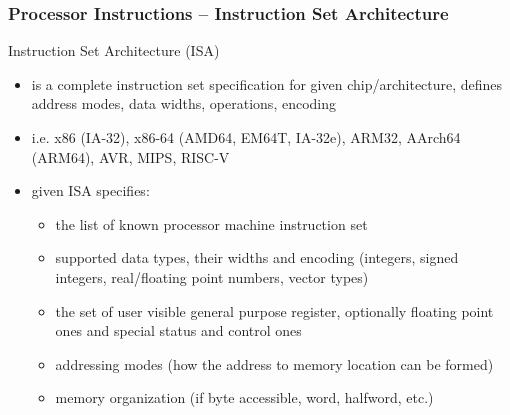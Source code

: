 \documentclass{beamer}
\begin{document}
\begin{frame}
\frametitle{Processor Instructions -- Instruction Set Architecture}

Instruction Set Architecture (ISA)
\begin{itemize}
\item  is a complete instruction set specification for given chip/architecture, defines address modes, data widths, operations, encoding
\item i.e. x86 (IA-32), x86-64 (AMD64, EM64T, IA-32e), ARM32, AArch64 (ARM64), AVR, MIPS, RISC-V
\item given ISA specifies:
\begin{itemize}
\item the list of known processor machine instruction set
\item supported data types, their widths and encoding (integers, signed integers, real/floating point numbers, vector types)
\item the set of user visible general purpose register, optionally floating point ones and special status and control ones
\item addressing modes (how the address to memory location can be formed)
\item memory organization (if byte accessible, word, halfword, etc.)
\end{itemize}
\end{itemize}

\end{frame}
\end{document}
